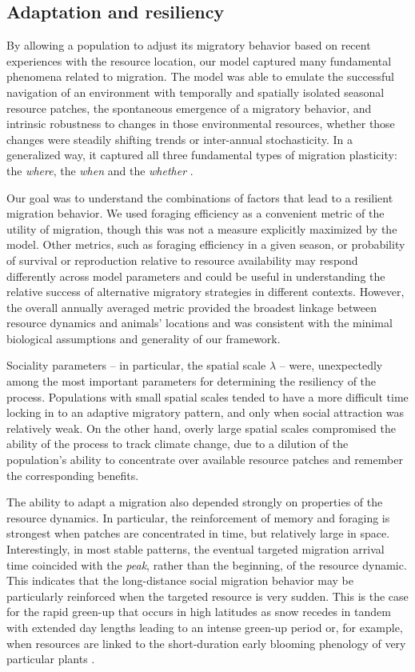 \documentclass[utf8]{frontiersSCNS} %
\begin{document}
\subsection{Adaptation and resiliency}
	
	By allowing a population to adjust its migratory behavior based on recent experiences with the resource location, our model captured many fundamental phenomena related to migration. The model was able to emulate the successful navigation of an environment with temporally and spatially isolated seasonal resource patches, the spontaneous emergence of a migratory behavior, and intrinsic robustness to changes in those environmental resources, whether those changes were steadily shifting trends or inter-annual stochasticity.  In a generalized way, it captured all three fundamental types of migration plasticity: the \textit{where}, the \textit{when} and the \textit{whether} \citep{Xu2021}.
		
	Our goal was to understand the combinations of factors that lead to a resilient migration behavior. We used foraging efficiency as a convenient metric of the utility of migration, though this was not a measure explicitly maximized by the model. Other metrics, such as foraging efficiency in a given season, or probability of survival or reproduction relative to resource availability \citep{Bauer2020} may respond differently across model parameters and could be useful in understanding the relative success of alternative migratory strategies in different contexts. However, the overall annually averaged metric provided the broadest linkage between resource dynamics and animals' locations and was consistent with the minimal biological assumptions and generality of our framework.
	
	Sociality parameters -- in particular, the spatial scale $\lambda$ -- were, unexpectedly among the most important parameters for determining the resiliency of the process. Populations with small spatial scales tended to have a more difficult time locking in to an adaptive migratory pattern, and only when social attraction was relatively weak. On the other hand, overly large spatial scales compromised the ability of the process to track climate change, due to a dilution of the population's ability to concentrate over available resource patches and remember the corresponding benefits.  
	
	The ability to adapt a migration also depended strongly on properties of the resource dynamics. In particular, the reinforcement of memory and foraging is strongest when patches are concentrated in time, but relatively large in space. Interestingly, in most stable patterns, the eventual targeted migration arrival time coincided with the \emph{peak}, rather than the beginning, of the resource dynamic. This indicates that the long-distance social migration behavior may be particularly reinforced when the targeted resource is very sudden. This is the case for the rapid green-up that occurs in high latitudes as snow recedes in tandem with extended day lengths leading to an intense green-up period \citep{Park2020} or, for example, when resources are linked to the short-duration early blooming phenology of very particular plants \citep{Post2007, Renner2018}. 
	
\end{document}
